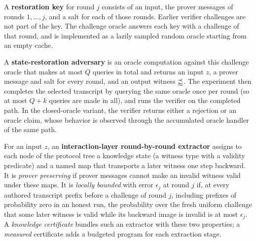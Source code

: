\begin{definition}
    \label{def:sr_experiment}
    A \textbf{restoration key} for round \(j\) consists of an input, the prover messages of rounds
    \(1, \ldots, j\), and a salt for each of those rounds. Earlier verifier challenges are not part
    of the key. The challenge oracle answers each key with a challenge of that round, and is
    implemented as a lazily sampled random oracle starting from an empty cache.

    A \textbf{state-restoration adversary} is an oracle computation against this challenge oracle
    that makes at most \(Q\) queries in total and returns an input \(z\), a prover message and salt
    for every round, and an output witness \(\mathbb{w}\). The experiment then completes the selected
    transcript by querying the same oracle once per round (so at most \(Q + k\) queries are made in
    all), and runs the verifier on the completed path. In the closed-oracle variant, the
    verifier returns either a rejection or an oracle claim, whose behavior is observed through the
    accumulated oracle handler of the same path.
    \leanok
\end{definition}

\begin{definition}
    \label{def:interaction_knowledge_certificate}
    For an input \(z\), an \textbf{interaction-layer round-by-round extractor} assigns to each node of the
    protocol tree a knowledge state (a witness type with a validity predicate) and a named map
    that transports a later witness one step backward. It is \emph{prover preserving} if prover
    messages cannot make an invalid witness valid under these maps. It is \emph{locally bounded}
    with error \(\epsilon_j\) at round \(j\) if, at every authored transcript prefix before a
    challenge of round \(j\), including prefixes of probability zero in an honest run, the
    probability over the fresh uniform challenge that some later witness is valid while its
    backward image is invalid is at most \(\epsilon_j\). A \emph{knowledge certificate} bundles
    such an extractor with these two properties; a \emph{measured} certificate adds a budgeted
    program for each extraction stage.
    \leanok
\end{definition}

